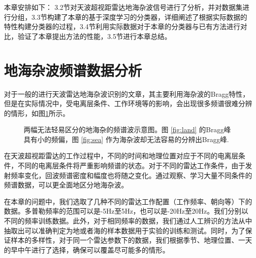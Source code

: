 本章安排如下： 3.2节对天波超视距雷达地海杂波信号进行了分析，并对数据集进行分组，3.3节构建了本章的基于深度学习的分类器，详细阐述了根据实际数据的特性构建分类器的过程，3.4节利用实际数据对于本章的分类器与已有方法进行对比，验证了本章提出方法的性能，3.5节进行本章总结。

\section{地海杂波频谱数据分析}
对于一般的进行天波雷达地海杂波识别的文章，其主要利用海杂波的Bragg特性，但是在实际情况中，受电离层条件、工作环境等的影响，会出现很多频谱很难分辨的情形，如图\ref{fig:spectrum}所示。
\begin{figure}[H]
	\centering
	\hfil
	\caption{两幅无法轻易区分的地海杂的频谱波示意图。图 \ref{fig:land} 的Bragg峰具有小的频偏，图 \ref{fig:sea} 作为海杂波却无法容易的分辨出Bragg峰.}
	\label{fig:spectrum}
\end{figure}
在天波超视距雷达的工作过程中，不同的时间和地理位置对应于不同的电离层条件，不同的电离层条件将严重影响频谱的状态。对于不同的雷达工作条件，由于发射频率变化，回波频谱密度和幅度也将随之变化。通过观察、学习大量不同条件的频谱数据，可以更全面地区分地海杂波。

在本章的问题中，我们选取了几种不同的雷达工作配置（工作频率、朝向等）下的数据。多普勒频率的范围可以是-5Hz至5Hz，也可以是-20Hz至20Hz。我们分别以不同的频率训练数据。此外，对于相同频率的数据，我们通过人工辨识的方法从中抽取出可以准确判定为地或者海的样本数据用于实验的训练和测试。同时，为了保证样本的多样性，对于同一个雷达参数下的数据，我们根据季节、地理位置、一天的早中午进行了选择，确保可以覆盖尽可能多的情形。

